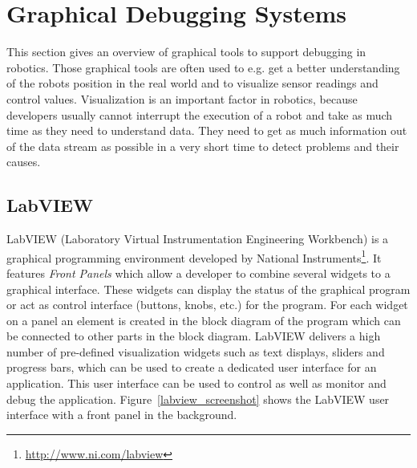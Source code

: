 

\section{Graphical Debugging Systems}
\label{graphical_section}
This section gives an overview of graphical tools to support debugging in robotics. Those graphical tools are often used to e.g. get a better understanding of the robots position in the real world and to visualize sensor readings and control values. Visualization is an important factor in robotics, because developers usually cannot interrupt the execution of a robot and take as much time as they need to understand data. They need to get as much information out of the data stream as possible in a very short time to detect problems and their causes.

\subsection{LabVIEW}

LabVIEW (Laboratory Virtual Instrumentation Engineering Workbench) is a graphical programming environment developed by National Instruments\footnote{\url{http://www.ni.com/labview}}. It features \emph{Front Panels} which allow a developer to combine several widgets to a graphical interface. These widgets can display the status of the graphical program or act as control interface (buttons, knobs, etc.) for the program. For each widget on a panel an element is created in the block diagram of the program which can be connected to other parts in the block diagram. LabVIEW delivers a high number of pre-defined visualization widgets such as text displays, sliders and progress bars, which can be used to create a dedicated user interface for an application. This user interface can be used to control as well as monitor and debug the application. Figure~\ref{labview_screenshot} shows the LabVIEW user interface with a front panel in the background.

